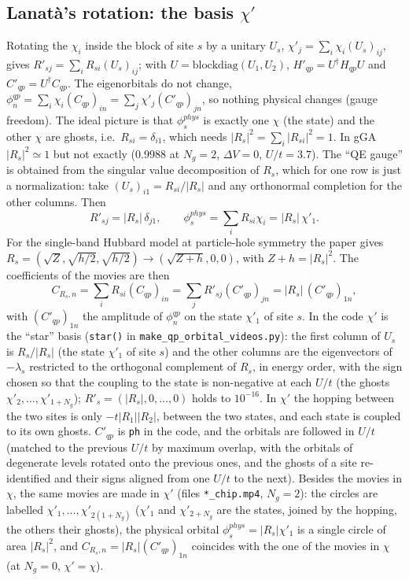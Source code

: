 \documentclass[11pt]{article}
\newcommand{\Ng}{N_{g}}
\newcommand{\dV}{\Delta V}
\begin{document}
\subsection{Lanat\`a's rotation: the basis $\chi'$~\cite{Lanata2023}}
\label{sec:chip}

Rotating the $\chi_i$ inside the block of site $s$ by a unitary $U_s$, $\chi'_j=\sum_i\chi_i(U_s)_{ij}$, gives $R'_{sj}=\sum_iR_{si}(U_s)_{ij}$; with $U=\mathrm{blockdiag}(U_1,U_2)$, $H'_{qp}=U^\dagger H_{qp}U$ and $C'_{qp}=U^\dagger C_{qp}$. The eigenorbitals do not change, $\phi^{qp}_n=\sum_i\chi_i(C_{qp})_{in}=\sum_j\chi'_j(C'_{qp})_{jn}$, so nothing physical changes (gauge freedom).
The ideal picture is that $\phi^{phys}_s$ is exactly one $\chi$ (the state) and the other $\chi$ are ghosts, i.e.\ $R_{si}=\delta_{i1}$, which needs $|R_s|^2=\sum_i|R_{si}|^2=1$. In gGA $|R_s|^2\simeq1$ but not exactly ($0.9988$ at $\Ng=2$, $\dV=0$, $U/t=3.7$).
The ``QE gauge'' is obtained from the singular value decomposition of $R_s$, which for one row is just a normalization: take $(U_s)_{i1}=R_{si}/|R_s|$ and any orthonormal completion for the other columns. Then
\begin{equation*}
R'_{sj}=|R_s|\,\delta_{j1},\qquad \phi^{phys}_s=\sum_iR_{si}\chi_i=|R_s|\,\chi'_1 .
\end{equation*}
For the single-band Hubbard model at particle-hole symmetry the paper gives $R_s=(\sqrt Z,\sqrt{h/2},\sqrt{h/2})\to(\sqrt{Z+h},0,0)$, with $Z+h=|R_s|^2$.
The coefficients of the movies are then
\begin{equation*}
C_{R_s,n}=\sum_iR_{si}(C_{qp})_{in}=\sum_jR'_{sj}(C'_{qp})_{jn}=|R_s|\,(C'_{qp})_{1n},
\end{equation*}
with $(C'_{qp})_{1n}$ the amplitude of $\phi^{qp}_n$ on the state $\chi'_1$ of site $s$. In the code $\chi'$ is the ``star'' basis (\texttt{star()} in \texttt{make\_qp\_orbital\_videos.py}): the first column of $U_s$ is $R_s/|R_s|$ (the state $\chi'_1$ of site $s$) and the other columns are the eigenvectors of $-\lambda_s$ restricted to the orthogonal complement of $R_s$, in energy order, with the sign chosen so that the coupling to the state is non-negative at each $U/t$ (the ghosts $\chi'_2,\dots,\chi'_{1+\Ng}$); $R'_s=(|R_s|,0,\dots,0)$ holds to $10^{-16}$. In $\chi'$ the hopping between the two sites is only $-t|R_1||R_2|$, between the two states, and each state is coupled to its own ghosts. $C'_{qp}$ is \texttt{ph} in the code, and the orbitals are followed in $U/t$ (matched to the previous $U/t$ by maximum overlap, with the orbitals of degenerate levels rotated onto the previous ones, and the ghosts of a site re-identified and their signs aligned from one $U/t$ to the next). Besides the movies in $\chi$, the same movies are made in $\chi'$ (files \texttt{*\_chip.mp4}, $\Ng=2$): the circles are labelled $\chi'_1,\dots,\chi'_{2(1+\Ng)}$ ($\chi'_1$ and $\chi'_{2+\Ng}$ are the states, joined by the hopping, the others their ghosts), the physical orbital $\phi^{phys}_s=|R_s|\chi'_1$ is a single circle of area $|R_s|^2$, and $C_{R_s,n}=|R_s|(C'_{qp})_{1n}$ coincides with the one of the movies in $\chi$ (at $\Ng=0$, $\chi'=\chi$).
\end{document}
